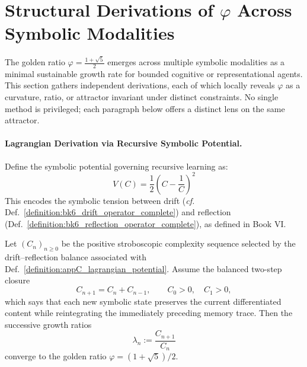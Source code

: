 \section{\texorpdfstring{Structural Derivations of $\varphi$ Across Symbolic Modalities}{Structural Derivations of phi Across Symbolic Modalities}}
\label{sec:appC_phi_geometry_theorem}

\begin{tcolorbox}[colback=blue!3!white,colframe=blue!40!black,title={Symbolic Attractor Statement}]
The golden ratio $\varphi = \frac{1 + \sqrt{5}}{2}$ emerges across multiple symbolic modalities as a minimal sustainable growth rate for bounded cognitive or representational agents. This section gathers independent derivations, each of which locally reveals $\varphi$ as a curvature, ratio, or attractor invariant under distinct constraints. No single method is privileged; each paragraph below offers a distinct lens on the same attractor.
\end{tcolorbox}

\paragraph{Lagrangian Derivation via Recursive Symbolic Potential.}
\label{para:appC_phi_lagrangian_derivation}

\begin{definition}
\label{definition:appC_lagrangian_potential}
Define the symbolic potential governing recursive learning as:
\[
V(C) = \frac{1}{2} \left(C - \frac{1}{C} \right)^2
\]
This encodes the symbolic tension between drift (\textit{cf.} Def.~\ref{definition:bk6_drift_operator_complete}) and reflection (Def.~\ref{definition:bk6_reflection_operator_complete}), as defined in Book VI.
\end{definition}

\begin{theorem}
\label{theorem:appC_phi_from_lagrangian}
Let $(C_n)_{n\ge0}$ be the positive stroboscopic complexity sequence selected by
the drift--reflection balance associated with
Def.~\ref{definition:appC_lagrangian_potential}. Assume the balanced two-step
closure
\[
C_{n+1}=C_n+C_{n-1},\qquad C_0>0,\quad C_1>0,
\]
which says that each new symbolic state preserves the current differentiated
content while reintegrating the immediately preceding memory trace. Then the
successive growth ratios
\[
\lambda_n:=\frac{C_{n+1}}{C_n}
\]
converge to the golden ratio
$\varphi=(1+\sqrt5)/2$.
\end{theorem}

